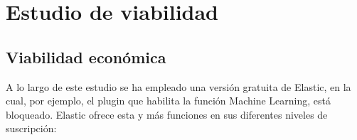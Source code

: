 \paragraph{}
\paragraph{}
\paragraph{}
\paragraph{}
\paragraph{}
\paragraph{}
\paragraph{}
\paragraph{}
\paragraph{}
\paragraph{}
\paragraph{}

\section{Estudio de viabilidad}

\subsection{Viabilidad económica}
A lo largo de este estudio se ha empleado una versión gratuita de Elastic, en la cual, por ejemplo, el plugin que habilita la función Machine Learning, está bloqueado. Elastic ofrece esta y más funciones en sus diferentes niveles de suscripción:

